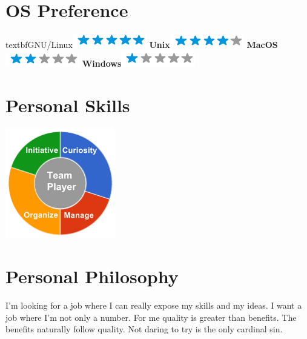 \documentclass[]{friggeri-cv}
\begin{document}
\begin{aside}
  \section{OS Preference}
    textbf{GNU/Linux}\includegraphics[scale=0.40]{img/5stars.png}
    \textbf{Unix}\includegraphics[scale=0.40]{img/4stars.png}
    \textbf{MacOS}\includegraphics[scale=0.40]{img/2stars.png}
    \textbf{Windows}\includegraphics[scale=0.40]{img/1stars.png}
    ~
  \section{Personal Skills}
    \includegraphics[scale=0.62]{img/personal.png}
    ~
\end{aside}

\section{Personal Philosophy}
    I'm looking for a job where I can really expose my skills and my ideas. I want a job where I'm not only a number. 
    For me quality is greater than benefits.
    The benefits naturally follow quality.
    Not daring to try is the only cardinal sin.
~
\end{document}

